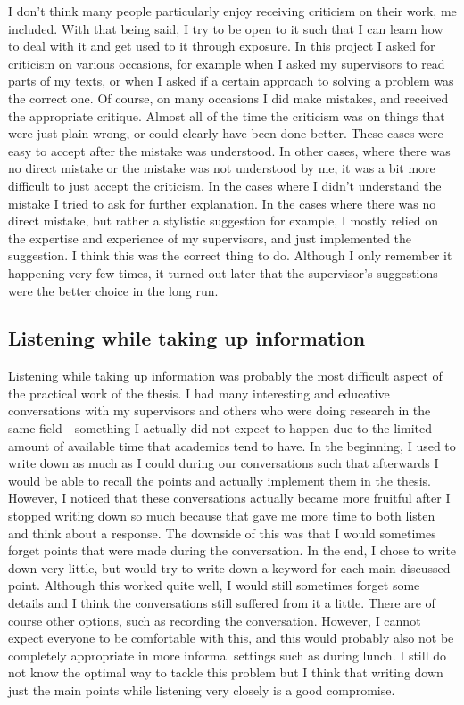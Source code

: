 \documentclass[]{article}
\begin{document}
I don't think many people particularly enjoy receiving criticism on their work, me included. With that being said, I try to be open to it such that I can learn how to deal with it and get used to it through exposure. In this project I asked for criticism on various occasions, for example when I asked my supervisors to read parts of my texts, or when I asked if a certain approach to solving a problem was the correct one. Of course, on many occasions I did make mistakes, and received the appropriate critique. Almost all of the time the criticism was on things that were just plain wrong, or could clearly have been done better. These cases were easy to accept after the mistake was understood. In other cases, where there was no direct mistake or the mistake was not understood by me, it was a bit more difficult to just accept the criticism. In the cases where I didn't understand the mistake I tried to ask for further explanation. In the cases where there was no direct mistake, but rather a stylistic suggestion for example, I mostly relied on the expertise and experience of my supervisors, and just implemented the suggestion. I think this was the correct thing to do. Although I only remember it happening very few times, it turned out later that the supervisor's suggestions were the better choice in the long run.

\subsection{Listening while taking up information}
\label{section:listeninginfo}
Listening while taking up information was probably the most difficult aspect of the practical work of the thesis. I had many interesting and educative conversations with my supervisors and others who were doing research in the same field - something I actually did not expect to happen due to the limited amount of available time that academics tend to have. In the beginning, I used to write down as much as I could during our conversations such that afterwards I would be able to recall the points and actually implement them in the thesis. However, I noticed that these conversations actually became more fruitful after I stopped writing down so much because that gave me more time to both listen and think about a response. The downside of this was that I would sometimes forget points that were made during the conversation. In the end, I chose to write down very little, but would try to write down a keyword for each main discussed point. Although this worked quite well, I would still sometimes forget some details and I think the conversations still suffered from it a little. There are of course other options, such as recording the conversation. However, I cannot expect everyone to be comfortable with this, and this would probably also not be completely appropriate in more informal settings such as during lunch. I still do not know the optimal way to tackle this problem but I think that writing down just the main points while listening very closely is a good compromise.
\end{document}
